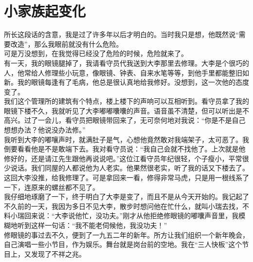 \fancyhead[RO]{\thepage} %
\fancyhead[LE]{\thepage} %
\chapter*{小家族起变化}
所长这段话的含意，我是过了许多年以后才明白的。当时我只是想，他既然说“需要改造”，那么我眼前就没有什么危险。\\

可是万没想到，在我觉得已经没了危险的时候，危险就来了。\\

有一天，我的眼镜腿掉了，我请看守员代我送到大李那里去修理。大李是个很巧的人，他常给人修理些小玩意，像眼镜、钟表、自来水笔等等，到他手里都能整旧如新。我的眼镜每逢有了毛病，他总是很认真地给我修好。没想到，这一次他的态度变了。\\

我们这个管理所的建筑有个特点，楼上楼下的声响可以互相听到。看守员拿了我的眼镜下楼不久，我就听见了大李嘟嘟囔囔的声音。语音虽不清楚，但可以听出是不高兴。过了一会儿，看守员把眼镜带回来了，无可奈何地对我说：“你是不是自己想想办法？他说没办法修。”\\

我听到大李的嘟嚷声时，就满肚子是气，心想他竟然敢对我端架子，太可恶了。我倒要看看他是不是敢端下去。我对看守员说：“我自己会就不找他了。上次就是他修好的，还是请江先生跟他再说说吧。”这位江看守员年纪很轻，个子瘦小，平常很少说话。我们同屋的人都说他为人老实。他果然很老实，听了我的话又下楼去了。\\

这回大李没推，给我修理了。可是拿回来一看，修得非常马虎，只是用一根线系了一下，连原来的螺丝都不见了。\\

我仔细地琢磨了一下，终于明白了大李是变了，而且不是从今天开始的。我记起了不久前的一天，我因为多日不见大李，散步时想问他在忙什么，就叫小瑞去找，不料小瑞回来说：“大李说他忙，没功夫。”刚才从他拒绝修眼镜的嘟囔声音里，我模糊地听到这样一句话：“我不能老伺候他，我没功夫！”\\

修眼镜的事过去不久，便到了一九五二年的新年。所方让我们组织一个新年晚会，自己演唱一些小节目，作为娱乐。舞台就是岗台前的空地。我在“三人快板”这个节目上，又发现了不祥之兆。\\

